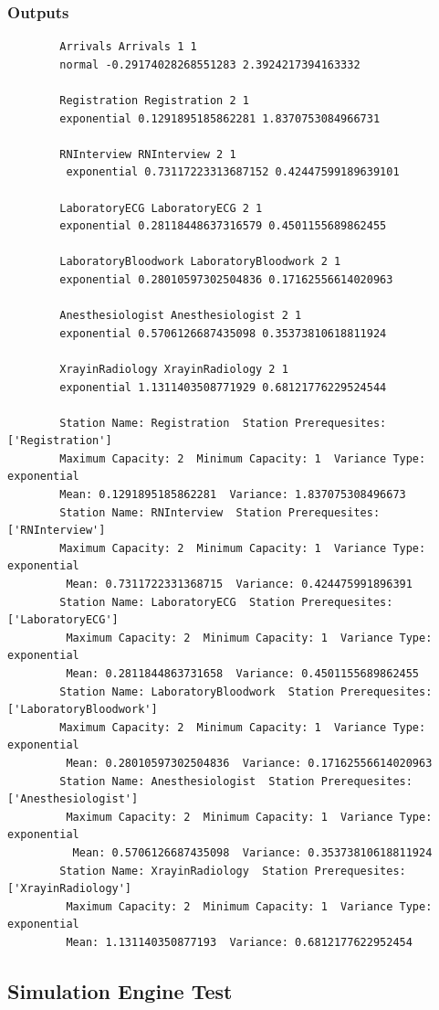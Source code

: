 \documentclass[12pt]{article}
\begin{document}
		\subsubsection{Outputs}
		\begin{verbatim}
		Arrivals Arrivals 1 1 
		normal -0.29174028268551283 2.3924217394163332
		
		Registration Registration 2 1 
		exponential 0.1291895185862281 1.8370753084966731
		
		RNInterview RNInterview 2 1
		 exponential 0.73117223313687152 0.42447599189639101
		
		LaboratoryECG LaboratoryECG 2 1 
		exponential 0.28118448637316579 0.4501155689862455
		
		LaboratoryBloodwork LaboratoryBloodwork 2 1 
		exponential 0.28010597302504836 0.17162556614020963
	
		Anesthesiologist Anesthesiologist 2 1 
		exponential 0.5706126687435098 0.35373810618811924
		
		XrayinRadiology XrayinRadiology 2 1 
		exponential 1.1311403508771929 0.68121776229524544
		
		Station Name: Registration  Station Prerequesites: ['Registration']  
		Maximum Capacity: 2  Minimum Capacity: 1  Variance Type: exponential  
		Mean: 0.1291895185862281  Variance: 1.837075308496673
		Station Name: RNInterview  Station Prerequesites: ['RNInterview']  
		Maximum Capacity: 2  Minimum Capacity: 1  Variance Type: exponential 
		 Mean: 0.7311722331368715  Variance: 0.424475991896391
		Station Name: LaboratoryECG  Station Prerequesites: ['LaboratoryECG'] 
		 Maximum Capacity: 2  Minimum Capacity: 1  Variance Type: exponential  
		 Mean: 0.2811844863731658  Variance: 0.4501155689862455
		Station Name: LaboratoryBloodwork  Station Prerequesites: ['LaboratoryBloodwork']  
		Maximum Capacity: 2  Minimum Capacity: 1  Variance Type: exponential 
		 Mean: 0.28010597302504836  Variance: 0.17162556614020963
		Station Name: Anesthesiologist  Station Prerequesites: ['Anesthesiologist'] 
		 Maximum Capacity: 2  Minimum Capacity: 1  Variance Type: exponential 
		  Mean: 0.5706126687435098  Variance: 0.35373810618811924
		Station Name: XrayinRadiology  Station Prerequesites: ['XrayinRadiology'] 
		 Maximum Capacity: 2  Minimum Capacity: 1  Variance Type: exponential  
		 Mean: 1.131140350877193  Variance: 0.6812177622952454
		\end{verbatim}
		
		\subsection{Simulation Engine Test}\label{simulationtests}
\end{document}
